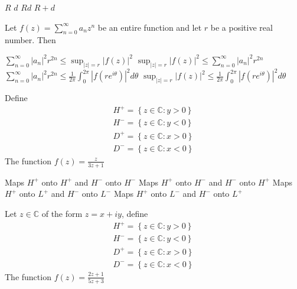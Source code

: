\documentclass[10pt]{exam}
\newcommand{\C}{\ensuremath{\mathbb{C}}}
\newcommand{\set}[1]{\ensuremath{\left \{ {#1} \right \}}}
\newcommand{\smallb}[1]{\ensuremath{\left ( {#1} \right )}}
\begin{document}
\begin{questions}
\begin{oneparchoices}
\choice $R$ 
\choice $d$ 
\choice $Rd$ 
\choice $R + d$ 
\end{oneparchoices}

\question 
Let $f(z) = \sum_{n = 0}^{\infty} a_nz^n$ be an entire function and let $r$ be a positive real number. Then 

\begin{checkboxes}
\choice $\sum_{n = 0}^{\infty} |a_n|^2 r^{2n} \leq \sup_{|z| = r} |f(z)|^2$
\choice $\sup_{|z| = r} |f(z)|^2 \leq \sum_{n = 0}^{\infty} |a_n|^2 r^{2n} $
\choice $\sum_{n = 0}^{\infty} |a_n|^2 r^{2n} \leq \frac{1}{2 \pi} \int_0^{2 \pi} |f \smallb{re^{i \theta}}|^2 d \theta$
\choice $\sup_{|z| = r} |f(z)|^2 \leq \frac{1}{2 \pi} \int_0^{2 \pi} |f \smallb{re^{i \theta}}|^2 d \theta$
\end{checkboxes}


\question 
Define 
\begin{align*}
H^+ = \set{z \in \C : y > 0} \\
H^- = \set{z \in \C : y < 0} \\
D^+ = \set{z \in \C : x > 0} \\
D^- = \set{z \in \C : x < 0} 
\end{align*}
The function $f(z) = \frac{z}{3z + 1}$ 

\begin{checkboxes}
\choice Maps $H^+$ onto $H^+$ and $H^-$ onto $H^-$ 
\choice Maps $H^+$ onto $H^-$ and $H^-$ onto $H^+$ 
\choice Maps $H^+$ onto $L^+$ and $H^-$ onto $L^-$ 
\choice Maps $H^+$ onto $L^-$ and $H^-$ onto $L^+$ 
\end{checkboxes}

\question 
Let $z \in \C$ of the form $z = x + iy$, define 
\begin{align*}
H^+ = \set{z \in \C : y > 0} \\
H^- = \set{z \in \C : y < 0} \\
D^+ = \set{z \in \C : x > 0} \\
D^- = \set{z \in \C : x < 0} 
\end{align*}
The function $f(z) = \frac{2z + 1}{5z + 3}$ 


\end{questions}
\end{document}
